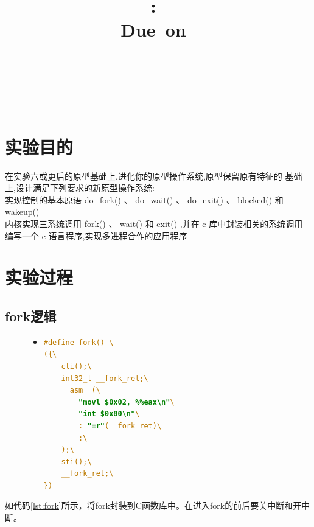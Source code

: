 \documentclass[a4paper]{article}
\title{
\vspace{2in}
\textmd{\textbf{\hmwkClass:\ \hmwkTitle}}\\
\normalsize\vspace{0.1in}\small{Due\ on\ \hmwkDueDate}\\
\vspace{0.1in}\large{\textit{\hmwkClassInstructor\ \hmwkClassTime}}
\vspace{3in}
}
\author{\textbf{\LARGE{\hmwkAuthorName}} \\ \\ \textbf{\LARGE{\hmwkAuthorId}}}
\date{} %
\begin{document}

\maketitle




\renewcommand{\contentsname}{Content} %
\newpage
\tableofcontents
{}
\newpage



\section{实验目的}
在实验六或更后的原型基础上,进化你的原型操作系统,原型保留原有特征的
基础上,设计满足下列要求的新原型操作系统:\\ 

实现控制的基本原语 do_fork() 、 do_wait() 、 do_exit() 、 blocked() 和 wakeup()\\ 

内核实现三系统调用 fork() 、 wait() 和 exit() ,并在 c 库中封装相关的系统调用\\ 

编写一个 c 语言程序,实现多进程合作的应用程序\\ 
\section{实验过程}
    \subsection{fork逻辑}
    \begin{figure}
    \begin{itemize}
    \item[] \begin{lstlisting}[language=C, label=lst:fork, caption=C库中封装的fork]
#define fork() \
({\
    cli();\
    int32_t __fork_ret;\
    __asm__(\
        "movl $0x02, %%eax\n"\
        "int $0x80\n"\
        : "=r"(__fork_ret)\
        :\
    );\
    sti();\
    __fork_ret;\
})
    \end{lstlisting}
    \end{itemize}
    \end{figure}
    如代码\ref{lst:fork}所示，将fork封装到C函数库中。在进入fork的前后要关中断和开中断。\\ 
\end{document}
